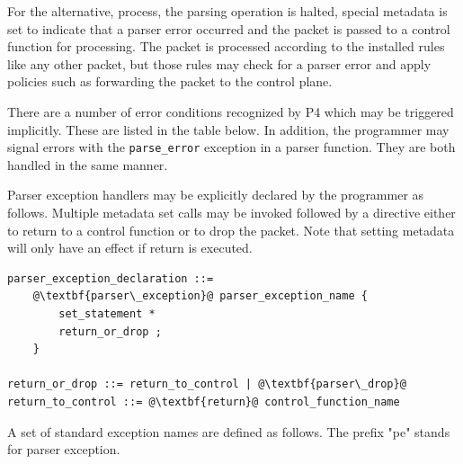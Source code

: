 \documentclass[12pt]{article}
\begin{document}
For the alternative, process, the parsing operation is halted, special metadata 
is set to indicate that a parser error occurred and the packet is passed to 
a control function for \matchaction processing. The packet is processed according 
to the installed \matchaction rules like any other packet, but those rules 
may check for a parser error and apply policies such as forwarding the packet 
to the control plane.

There are a number of error conditions recognized by P4 which may be triggered 
implicitly. These are listed in the table below. In addition, the programmer 
may signal errors with the \texttt{parse_error} exception in a parser function. They 
are both handled in the same manner.

Parser exception handlers may be explicitly declared by the programmer as 
follows. Multiple metadata set calls may be invoked followed by a directive 
either to return to a control function or to drop the packet. Note that setting 
metadata will only have an effect if return is executed.

\begin{lstlisting}[frame=single,backgroundcolor=\color{bnfgreen},escapechar=\@]
parser_exception_declaration ::=
    @\textbf{parser\_exception}@ parser_exception_name {
        set_statement *
        return_or_drop ;
    }

return_or_drop ::= return_to_control | @\textbf{parser\_drop}@
return_to_control ::= @\textbf{return}@ control_function_name
\end{lstlisting}



A set of standard exception names are defined as follows.  The prefix "pe" 
stands for parser exception.
\end{document}
